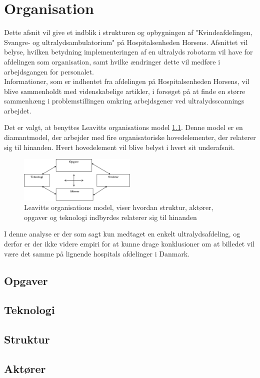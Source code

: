 \chapter{Organisation}
Dette afsnit vil give et indblik i strukturen og opbygningen af "Kvindeafdelingen, Svangre- og ultralydsambulatorium" på Hospitalsenheden Horsens. Afsnittet vil belyse, hvilken betydning implementeringen af en ultralyds robotarm vil have for afdelingen som organisation, samt hvilke ændringer dette vil medføre i arbejdsgangen for personalet. \\
Informationer, som er indhentet fra afdelingen på Hospitalsenheden Horsens, vil blive sammenholdt med videnskabelige artikler, i forsøget på at finde en større sammenhæng i problemstillingen omkring arbejdsgener ved ultralydsscannings arbejdet.

Det er valgt, at benyttes Leavitts organisations model \ref{LeavittModel}. Denne model er en diamantmodel, der arbejder med fire organisatoriske hovedelementer, der relaterer sig til hinanden. Hvert hovedelement vil blive belyst i hvert sit underafsnit. 

\begin{figure}[h!]\centering
	\includegraphics[width = 0.5\textwidth]{Figurer/LeavittModel}
	\caption{Leavitts organisations model, viser hvordan struktur, aktører, opgaver og teknologi indbyrdes relaterer sig til hinanden}
	\label{LeavittModel}
\end{figure}

I denne analyse er der som sagt kun medtaget en enkelt ultralydsafdeling, og derfor er der ikke videre empiri for at kunne drage konklusioner om at billedet vil være det samme på lignende hospitals afdelinger i Danmark. 

\section{Opgaver}


\section{Teknologi}

\section{Struktur}

\section{Aktører}